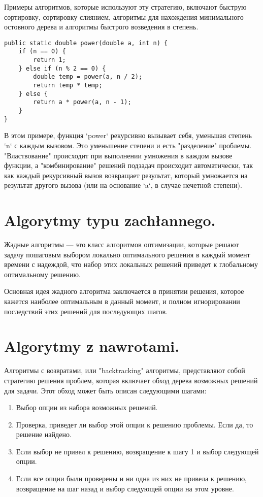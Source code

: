 Примеры алгоритмов, которые используют эту стратегию, включают быструю сортировку, сортировку слиянием, алгоритмы для нахождения минимального остовного дерева и алгоритмы быстрого возведения в степень.

\begin{lstlisting}
public static double power(double a, int n) {
    if (n == 0) {
        return 1;
    } else if (n % 2 == 0) {
        double temp = power(a, n / 2);
        return temp * temp;
    } else {
        return a * power(a, n - 1);
    }
}
\end{lstlisting}

В этом примере, функция `power` рекурсивно вызывает себя, уменьшая степень `n` с каждым вызовом. Это уменьшение степени и есть "разделение" проблемы. "Властвование" происходит при выполнении умножения в каждом вызове функции, а "комбинирование" решений подзадач происходит автоматически, так как каждый рекурсивный вызов возвращает результат, который умножается на результат другого вызова (или на основание `a`, в случае нечетной степени).

\section{Algorytmy typu zachłannego.}


Жадные алгоритмы — это класс алгоритмов оптимизации, которые решают задачу пошаговым выбором локально оптимального решения в каждый момент времени с надеждой, что набор этих локальных решений приведет к глобальному оптимальному решению.

Основная идея жадного алгоритма заключается в принятии решения, которое кажется наиболее оптимальным в данный момент, и полном игнорировании последствий этих решений для последующих шагов.

\section{Algorytmy z nawrotami.}

Алгоритмы с возвратами, или "backtracking" алгоритмы, представляют собой стратегию решения проблем, которая включает обход дерева возможных решений для задачи. Этот обход может быть описан следующими шагами:

\begin{enumerate}
\item Выбор опции из набора возможных решений.
\item Проверка, приведет ли выбор этой опции к решению проблемы. Если да, то решение найдено.
\item Если выбор не привел к решению, возвращение к шагу 1 и выбор следующей опции.
\item Если все опции были проверены и ни одна из них не привела к решению, возвращение на шаг назад и выбор следующей опции на этом уровне.
\end{enumerate}

